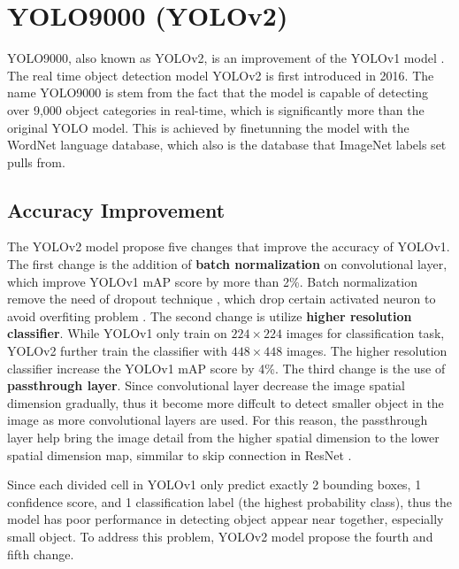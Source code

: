 \section{YOLO9000 (YOLOv2)}  \label{sec:yolov2}

YOLO9000, also known as YOLOv2, is an improvement of the YOLOv1 model \cite{yolo9000_2017}. The real time object detection model YOLOv2 is first introduced in 2016. The name YOLO9000 is stem from the fact that the model is capable of detecting over 9,000 object categories in real-time,  which is significantly more than the original YOLO model. This is achieved by finetunning the model with the WordNet language database, which also is the database that ImageNet labels set pulls from.

\subsection{Accuracy Improvement}
The YOLOv2 model propose five changes that improve the accuracy of YOLOv1. The first change is the addition of \textbf{batch normalization} on convolutional layer, which improve YOLOv1 mAP score by more than 2\%. Batch normalization remove the need of dropout technique \cite{dropout_2014}, which drop certain activated neuron to avoid overfiting problem \cite{szeliski_cv_book}. The second change is utilize \textbf{higher resolution classifier}. While YOLOv1 only train on $224 \times 224$ images for classification task, YOLOv2 further train the classifier with $448 \times 448$ images. The higher resolution classifier increase the YOLOv1 mAP score by 4\%. The third change is the use of \textbf{passthrough layer}. Since convolutional layer decrease the image spatial dimension gradually, thus it become more diffcult to detect smaller object in the image as more convolutional layers are used. For this reason, the passthrough layer help bring the image detail from the higher spatial dimension to the lower spatial dimension map, simmilar to skip connection in ResNet \cite{resnet_2016}.

Since each divided cell in YOLOv1 only predict exactly 2 bounding boxes, 1 confidence score, and 1 classification label (the highest probability class), thus the model has poor performance in detecting object appear near together, especially small object. To address this problem, YOLOv2 model propose the fourth and fifth change. 

